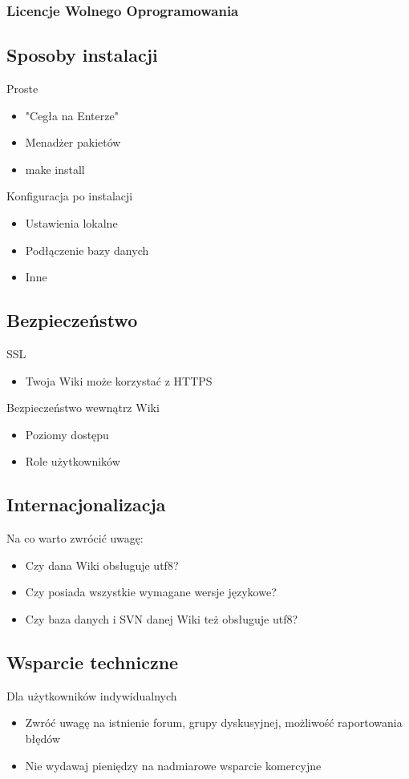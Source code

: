 \documentclass{article}
\begin{document}
	\subsubsection{Licencje Wolnego Oprogramowania}
	\subsection{Sposoby instalacji}
		Proste
		\begin{itemize}
			\item "Cegła na Enterze"
			\item Menadżer pakietów
			\item make install
		\end{itemize}
		Konfiguracja po instalacji
		\begin{itemize}
			\item Ustawienia lokalne
			\item Podłączenie bazy danych
			\item Inne
		\end{itemize}
	\subsection{Bezpieczeństwo}
		SSL
		\begin{itemize}
			\item Twoja Wiki może korzystać z HTTPS
		\end{itemize}
		Bezpieczeństwo wewnątrz Wiki
		\begin{itemize}
			\item Poziomy dostępu
			\item Role użytkowników
		\end{itemize}
	\subsection{Internacjonalizacja}
		Na co warto zwrócić uwagę:
		\begin{itemize}
			\item Czy dana Wiki obsługuje utf8?
			\item Czy posiada wszystkie wymagane wersje językowe?
			\item Czy baza danych i SVN danej Wiki też obsługuje utf8?
		\end{itemize}
			
	\subsection{Wsparcie techniczne}
		Dla użytkowników indywidualnych
		\begin{itemize}
			\item Zwróć uwagę na istnienie forum, grupy dyskusyjnej, możliwość raportowania błędów 
			\item Nie wydawaj pieniędzy na nadmiarowe wsparcie komercyjne
		\end{itemize}
		
\end{document}
